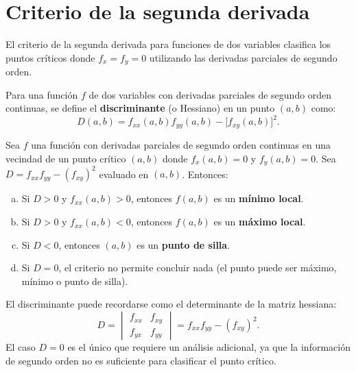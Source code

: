 \section{Criterio de la segunda derivada}

El criterio de la segunda derivada para funciones de dos variables
clasifica los puntos críticos donde $f_x=f_y=0$ utilizando las derivadas
parciales de segundo orden.

\begin{definition}
Para una función $f$ de dos variables con derivadas parciales de segundo
orden continuas, se define el \textbf{discriminante} (o Hessiano) en un
punto $(a,b)$ como:
\[
D(a,b) = f_{xx}(a,b) f_{yy}(a,b) - \bigl[f_{xy}(a,b)\bigr]^2.
\]
\end{definition}

\begin{theorem}
Sea $f$ una función con derivadas parciales de segundo orden continuas en
una vecindad de un punto crítico $(a,b)$ donde $f_x(a,b)=0$ y
$f_y(a,b)=0$. Sea $D = f_{xx}f_{yy} - (f_{xy})^2$ evaluado en $(a,b)$.
Entonces:
\begin{enumerate}[a)]
    \item Si $D > 0$ y $f_{xx}(a,b) > 0$, entonces $f(a,b)$ es un
    \textbf{mínimo local}.
    \item Si $D > 0$ y $f_{xx}(a,b) < 0$, entonces $f(a,b)$ es un
    \textbf{máximo local}.
    \item Si $D < 0$, entonces $(a,b)$ es un \textbf{punto de silla}.
    \item Si $D = 0$, el criterio no permite concluir nada (el punto
    puede ser máximo, mínimo o punto de silla).
\end{enumerate}
\end{theorem}

\begin{rem}
El discriminante puede recordarse como el determinante de la matriz
hessiana:
\[
D = \begin{vmatrix}
f_{xx} & f_{xy} \\
f_{yx} & f_{yy}
\end{vmatrix}
= f_{xx} f_{yy} - (f_{xy})^2.
\]
El caso $D=0$ es el único que requiere un análisis adicional, ya que la
información de segundo orden no es suficiente para clasificar el punto
crítico.
\end{rem}

